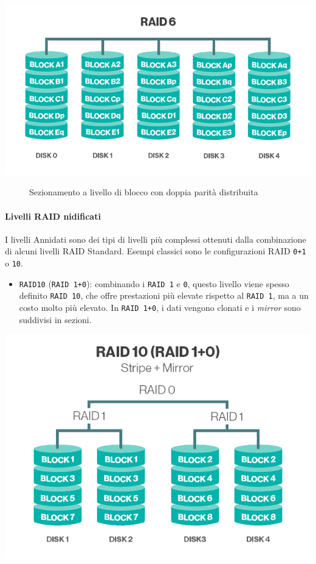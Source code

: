 \begin{itemize}
\begin{center}
\includegraphics[scale=0.55]{img/raid66.png}
\end{center}

\begin{figure}[htbp]
\caption{Sezionamento a livello di blocco con doppia parit\`{a} distribuita\label{figura1.100} \cite{etichetta9}}
\end{figure}
\end{itemize}


\paragraph{Livelli RAID nidificati}

I livelli Annidati sono dei tipi di livelli pi\`{u} complessi ottenuti dalla combinazione di alcuni livelli RAID Standard. Esempi classici sono le configurazioni RAID \verb"0+1" o \verb"10".

\begin{itemize}
\item 
\verb"RAID10" (\verb"RAID 1+0"): combinando i \verb"RAID 1" e \verb"0", questo livello viene spesso definito \verb"RAID 10", che offre prestazioni pi\`{u} elevate rispetto al \verb"RAID 1", ma a un costo molto pi\`{u} elevato. In \verb"RAID 1+0", i dati vengono clonati e i \textit{mirror} sono suddivisi in sezioni. \cite{etichetta9}
\end{itemize}

\begin{center}
\includegraphics[scale=0.50]{img/raid10.png}
\end{center}

